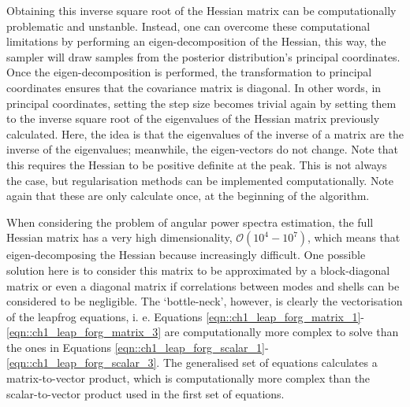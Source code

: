\qquad Obtaining this inverse square root of the Hessian matrix can be computationally problematic and unstanble. Instead, one can overcome these computational limitations by performing an eigen-decomposition of the Hessian, this way, the sampler will draw samples from the posterior distribution's principal coordinates. Once the eigen-decomposition is performed, the transformation to principal coordinates ensures that the covariance matrix is diagonal. In other words, in principal coordinates, setting the step size becomes trivial again by setting them to the inverse square root of the eigenvalues of the Hessian matrix previously calculated. Here, the idea is that the eigenvalues of the inverse of a matrix are the inverse of the eigenvalues; meanwhile, the eigen-vectors do not change. Note that this requires the Hessian to be positive definite at the peak. This is not always the case, but regularisation methods can be implemented computationally. Note again that these are only calculate once, at the beginning of the algorithm.

\qquad When considering the problem of angular power spectra estimation, the full Hessian matrix has a very high dimensionality, $\mathcal{O}(10^{4}-10^{7})$, which means that eigen-decomposing the Hessian because increasingly difficult. One possible solution here is to consider this matrix to be approximated by a block-diagonal matrix or even a diagonal matrix if correlations between modes and shells can be considered to be negligible. The `bottle-neck', however, is clearly the vectorisation of the leapfrog equations, i. e. Equations \eqref{eqn::ch1_leap_forg_matrix_1}-\eqref{eqn::ch1_leap_forg_matrix_3} are computationally more complex to solve than the ones in Equations \eqref{eqn::ch1_leap_forg_scalar_1}-\eqref{eqn::ch1_leap_forg_scalar_3}. The generalised set of equations calculates a matrix-to-vector product, which is computationally more complex than the scalar-to-vector product used in the first set of equations.

